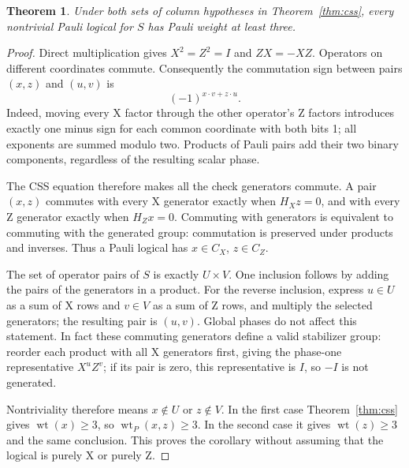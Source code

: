 \documentclass{article}
\newtheorem{theorem}{Theorem}
\DeclareMathOperator{\wt}{wt}
\begin{document}
\begin{theorem}\label{thm:pauli}
Under both sets of column hypotheses in Theorem~\ref{thm:css}, every nontrivial Pauli
logical for \(S\) has Pauli weight at least three.
\end{theorem}

\begin{proof}
  Direct multiplication gives \(X^2 = Z^2 = I\) and \(ZX = -XZ\). Operators on different
  coordinates commute. Consequently the commutation sign between pairs \((x, z)\) and
  \((u, v)\) is
  \begin{equation}
    (-1)^{x \cdot v + z \cdot u}.
  \end{equation}
  Indeed, moving every X factor through the other operator's Z factors introduces exactly
  one minus sign for each common coordinate with both bits 1; all exponents are summed
  modulo two. Products of Pauli pairs add their two binary components, regardless of the
  resulting scalar phase.

  The CSS equation therefore makes all the check generators commute. A pair \((x, z)\)
  commutes with every X generator exactly when \(H_X z = 0\), and with every Z generator
  exactly when \(H_Z x = 0\). Commuting with generators is equivalent to commuting with the
  generated group: commutation is preserved under products and inverses. Thus a Pauli
  logical has \(x \in C_X\), \(z \in C_Z\).

  The set of operator pairs of \(S\) is exactly \(U \times V\). One inclusion follows by
  adding the pairs of the generators in a product. For the reverse inclusion, express
  \(u \in U\) as a sum of X rows and \(v \in V\) as a sum of Z rows, and multiply the
  selected generators; the resulting pair is \((u, v)\). Global phases do not affect this
  statement. In fact these commuting generators define a valid stabilizer group: reorder
  each product with all X generators first, giving the phase-one representative
  \(X^u Z^v\); if its pair is zero, this representative is \(I\), so \(-I\) is not
  generated.

  Nontriviality therefore means \(x \notin U\) or \(z \notin V\). In the first case
  Theorem~\ref{thm:css} gives \(\wt(x) \ge 3\), so \(\wt_P(x, z) \ge 3\). In the second
  case it gives \(\wt(z) \ge 3\) and the same conclusion. This proves the corollary without
  assuming that the logical is purely X or purely Z.
\end{proof}
\end{document}
